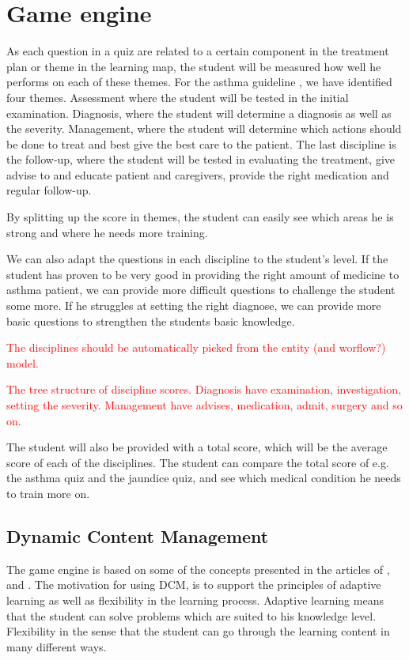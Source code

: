 \section{Game engine}



As each question in a quiz are related to a certain component in the treatment plan or theme in the learning map, the student will be measured how well he performs on each of these themes. For the asthma guideline \parencite{RepublicofKeny2016}, we have identified four themes. Assessment where the student will be tested in the initial examination. Diagnosis, where the student will determine a diagnosis as well as the severity. Management, where the student will determine which actions should be done to treat and best give the best care to the patient. The last discipline is the follow-up, where the student will be tested in evaluating the treatment, give advise to and educate patient and caregivers, provide the right medication and regular follow-up.

By splitting up the score in themes, the student can easily see which areas he is strong and where he needs more training. 



We can also adapt the questions in each discipline to the student's level. If the student has proven to be very good in providing the right amount of medicine to asthma patient, we can provide more difficult questions to challenge the student some more. If he struggles at setting the right diagnose, we can provide more basic questions to strengthen the students basic knowledge. 

\textcolor{red}{The disciplines should be automatically picked from the entity (and worflow?) model.}

\textcolor{red}{The tree structure of discipline scores. Diagnosis have examination, investigation, setting the severity. Management have advises, medication, admit, surgery and so on.}




The student will also be provided with a total score, which will be the average score of each of the disciplines. The student can compare the total score of e.g. the asthma quiz and the jaundice quiz, and see which medical condition he needs to train more on.


\subsection{Dynamic Content Management}
The game engine is based on some of the concepts presented in the articles of \textcite{Eide2008}, \textcite{Kristensen2011} and \textcite{Kristensen2013}. The motivation for using DCM, is to support the principles of adaptive learning as well as flexibility in the learning process. Adaptive learning means that the student can solve problems which are suited to his knowledge level. Flexibility in the sense that the student can go through the learning content in many different ways.

